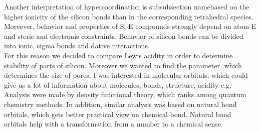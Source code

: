 \documentclass[
  digital, %
  table,   %
  lof,     %
  lot,     %
]{fithesis3}
\begin{document}
 Another interpretation of hypercoordination is subsubsection namebased on the higher ionicity of the silicon bonds than in the corresponding tetrahedral species. Moreover, behavior and properties of Si-E compounds strongly depend on atom E and steric and electronis constraints. Behavior of silicon bonds can be divided into ionic, sigma bonds and dative interactions. \cite{Wagler2014}\\
For this reason we decided to compare Lewis acidity in order to determine stability of parts of silicon. Moreover we wanted to find the parameter, which determines the size of pores. I was interested in molecular orbitals, which could give us a lot of information about molecules, bonds, structure, acidity e.g. Analysis were made by density functional theory, which ranks among quantum chemistry methods. In addition, similar analysis was based on natural bond orbitals, which gets better practical view on chemical bond. Natural bond orbitals help with a transformation from a number to a chemical sense.
\end{document}
